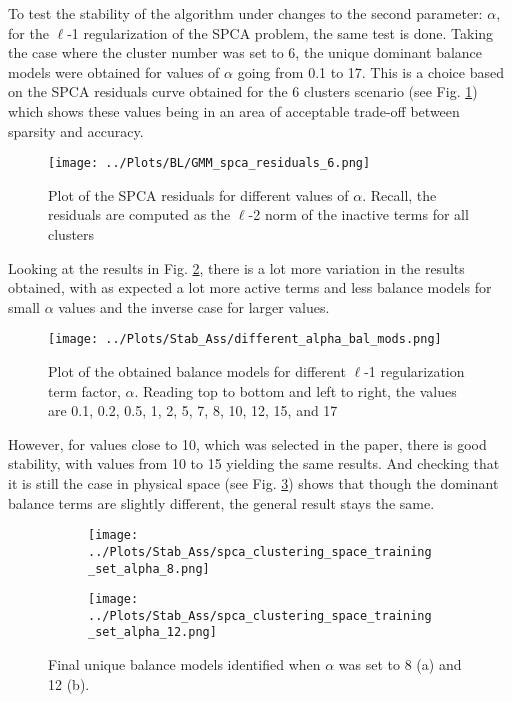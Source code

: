 \documentclass[12pt]{report} %
\begin{document}
To test the stability of the algorithm under changes to the second parameter: $\alpha$, for the $\ell$-1 regularization of the SPCA problem, the same test is done. Taking the case where the cluster number was set to 6, the unique dominant balance models were obtained for values of $\alpha$ going from 0.1 to 17. This is a choice based on the SPCA residuals curve obtained for the 6 clusters scenario (see Fig. \ref{fig:spca_residuals}) which shows these values being in an area of acceptable trade-off between sparsity and accuracy.

\begin{figure}
  \centering
  \texttt{[image: ../Plots/BL/GMM\_spca\_residuals\_6.png]}
  \caption{Plot of the SPCA residuals for different values of $\alpha$. Recall, the residuals are computed as the $\ell$-2 norm of the inactive terms for all clusters}
  \label{fig:spca_residuals}
\end{figure}

\newpage

Looking at the results in Fig. \ref{fig:diff_alpha_bal_mods}, there is a lot more variation in the results obtained, with as expected a lot more active terms and less balance models for small $\alpha$ values and the inverse case for larger values.

\begin{figure}[htbp]
  \centering
  \texttt{[image: ../Plots/Stab\_Ass/different\_alpha\_bal\_mods.png]}
  \caption{Plot of the obtained balance models for different $\ell$-1 regularization term factor, $\alpha$. Reading top to bottom and left to right, the values are 0.1, 0.2, 0.5, 1, 2, 5, 7, 8, 10, 12, 15, and 17}
  \label{fig:diff_alpha_bal_mods}
\end{figure}

However, for values close to 10, which was selected in the paper, there is good stability, with values from 10 to 15 yielding the same results. And checking that it is still the case in physical space (see Fig. \ref{fig:diif_alpha_clustering}) shows that though the dominant balance terms are slightly different, the general result stays the same.

\begin{figure}[htbp]
  \centering
  \begin{subfigure}[b]{0.7\textwidth}
      \texttt{[image: ../Plots/Stab\_Ass/spca\_clustering\_space\_training\_set\_alpha\_8.png]}
      \caption{}
  \end{subfigure}
  \begin{subfigure}[b]{0.7\textwidth}
      \texttt{[image: ../Plots/Stab\_Ass/spca\_clustering\_space\_training\_set\_alpha\_12.png]}
      \caption{}
  \end{subfigure}
  \caption{Final unique balance models identified when $\alpha$ was set to 8 (a) and 12 (b).}
  \label{fig:diif_alpha_clustering}
\end{figure}
\end{document}
